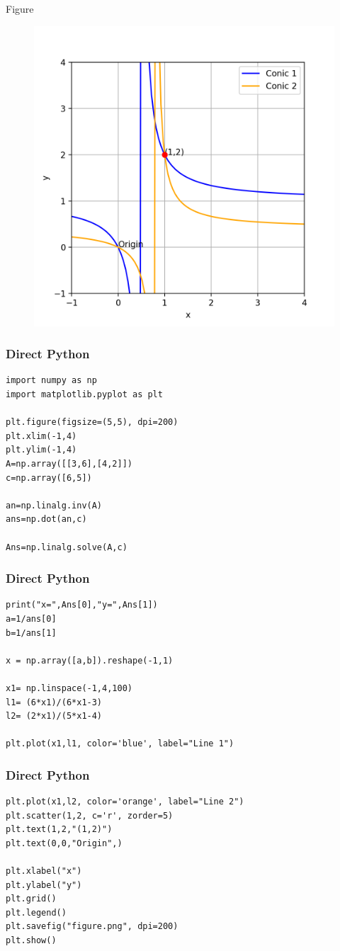 \documentclass{beamer}
\begin{document}
\begin{frame}{Figure}
    \begin{figure}[H]
        \centering
        \includegraphics[width=0.6\columnwidth]{figs/figure.png}
        \caption{}
        \label{fig:placeholder}
    \end{figure}
\end{frame}
\begin{frame}[fragile]
\frametitle{Direct Python}
\begin{lstlisting}
import numpy as np
import matplotlib.pyplot as plt

plt.figure(figsize=(5,5), dpi=200)
plt.xlim(-1,4)
plt.ylim(-1,4)
A=np.array([[3,6],[4,2]])
c=np.array([6,5])

an=np.linalg.inv(A)
ans=np.dot(an,c)

Ans=np.linalg.solve(A,c)
\end{lstlisting}
\end{frame}
\begin{frame}[fragile]
\frametitle{Direct Python}
\begin{lstlisting}
print("x=",Ans[0],"y=",Ans[1])
a=1/ans[0]
b=1/ans[1]

x = np.array([a,b]).reshape(-1,1)

x1= np.linspace(-1,4,100)
l1= (6*x1)/(6*x1-3)
l2= (2*x1)/(5*x1-4)

plt.plot(x1,l1, color='blue', label="Line 1")
\end{lstlisting}
\end{frame}
\begin{frame}[fragile]
\frametitle{Direct Python}
\begin{lstlisting}
plt.plot(x1,l2, color='orange', label="Line 2")
plt.scatter(1,2, c='r', zorder=5)
plt.text(1,2,"(1,2)")
plt.text(0,0,"Origin",)

plt.xlabel("x")
plt.ylabel("y")
plt.grid()
plt.legend()
plt.savefig("figure.png", dpi=200)
plt.show()
\end{lstlisting}
\end{frame}
\end{document}
